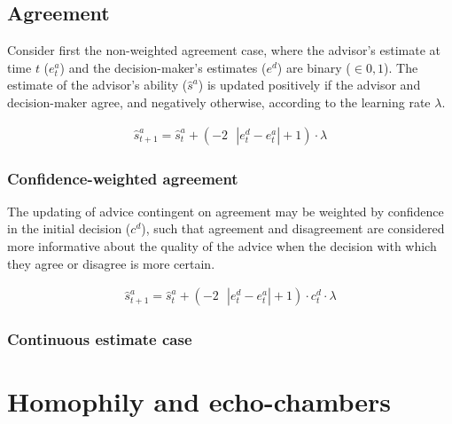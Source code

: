 \documentclass[a4paper, nobind]{templates/ociamthesis}
\begin{document}
\hypertarget{agreement}{%
\subsection*{Agreement}\label{agreement}}

Consider first the non-weighted agreement case, where the advisor's estimate at time \(t\) (\(e^{a}_{t}\)) and the decision-maker's estimates (\(e^d\)) are binary (\(\in0,1\)). The estimate of the advisor's ability (\(\hat{s}^{a}\)) is updated positively if the advisor and decision-maker agree, and negatively otherwise, according to the learning rate \(\lambda\).

\begin{align}
\hat{s}^a_{t+1} = \hat{s}^a_{t} + (-2 \text{ } |e^{d}_{t}-e^{a}_{t}|+1)\cdot\lambda
\label{eq:advisor-agreement-binary}
\end{align}

\hypertarget{confidence-weighted-agreement}{%
\subsubsection*{Confidence-weighted agreement}\label{confidence-weighted-agreement}}

The updating of advice contingent on agreement may be weighted by confidence in the initial decision (\(c^d\)), such that agreement and disagreement are considered more informative about the quality of the advice when the decision with which they agree or disagree is more certain.

\begin{align}
\hat{s}^a_{t+1} = \hat{s}^a_{t} + (-2 \text{ } |e^{d}_{t}-e^{a}_{t}|+1)\cdot c^d_t \cdot \lambda
\label{eq:advisor-agreement-weighted-binary}
\end{align}

\hypertarget{continuous-estimate-case}{%
\subsubsection*{Continuous estimate case}\label{continuous-estimate-case}}

\hypertarget{homophily-and-echo-chambers}{%
\section*{Homophily and echo-chambers}\label{homophily-and-echo-chambers}}
\end{document}
